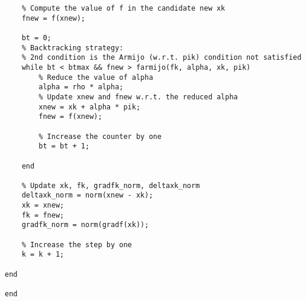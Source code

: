 \documentclass{article}
\begin{document}
\begin{verbatim}
    % Compute the value of f in the candidate new xk
    fnew = f(xnew);
    
    bt = 0;
    % Backtracking strategy: 
    % 2nd condition is the Armijo (w.r.t. pik) condition not satisfied
    while bt < btmax && fnew > farmijo(fk, alpha, xk, pik)
        % Reduce the value of alpha
        alpha = rho * alpha;
        % Update xnew and fnew w.r.t. the reduced alpha
        xnew = xk + alpha * pik;
        fnew = f(xnew);
        
        % Increase the counter by one
        bt = bt + 1;
        
    end
    
    % Update xk, fk, gradfk_norm, deltaxk_norm
    deltaxk_norm = norm(xnew - xk);
    xk = xnew;
    fk = fnew;
    gradfk_norm = norm(gradf(xk));
    
    % Increase the step by one
    k = k + 1;
   
end

end


\end{verbatim}
\end{document}
